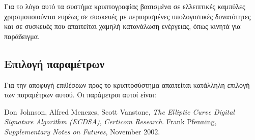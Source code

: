\documentclass[12pt]{article}
\begin{document}
Για το λόγο αυτό τα συστήμα κρυπτογραφίας βασισμένα σε ελλειπτικές καμπύλες χρησιμοποιούνται ευρέως σε συσκευές με περιορισμένες υπολογιστικές δυνατότητες και σε συσκευές που απαιτείται χαμηλή κατανάλωση ενέργειας, όπως κινητά για παράδειγμα.

\subsection{Επιλογή παραμέτρων}
Για την αποφυγή επιθέσεων προς το κρυπτοσύστημα απαιτείται κατάλληλη επιλογή των παραμέτρων αυτού.
Οι παράμετροι αυτοί είναι:






\begin{thebibliography}{2} 
 Don Johnson, Alfred Menezes, Scott Vanstone, \emph{The Elliptic Curve Digital Signature Algorithm (ECDSA)}, \emph{Certicom Research}.
 Frank Pfenning, \emph{Supplementary Notes on Futures}, November 2002.
\end{thebibliography}
\end{document}
